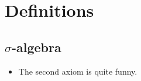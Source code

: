\section{Definitions}
\subsection{$\sigma$-algebra}
\begin{itemize}
    \item The second axiom is quite funny.
\end{itemize}

